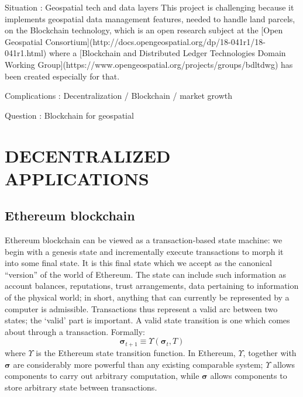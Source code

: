 \documentclass{isprs} %
\begin{document}
Situation : Geospatial tech and data layers
This project is challenging because it implements geospatial data management features, needed to handle land parcels, on the Blockchain technology, which is an open research subject at the [Open Geospatial Consortium](http://docs.opengeospatial.org/dp/18-041r1/18-041r1.html) where a [Blockchain and Distributed Ledger Technologies Domain Working Group](https://www.opengeospatial.org/projects/groups/bdltdwg) has been created especially for that.


Complications : Decentralization / Blockchain / market growth

Question : Blockchain for geospatial 


\newpage

\section{DECENTRALIZED APPLICATIONS}\label{sec:DECENTRALIZED APPLICATIONS}
 
\sloppy

\subsection{Ethereum blockchain}\label{sec:Ethereum blockchain}

Ethereum blockchain can be viewed as a transaction-based state machine: we begin with a genesis state and incrementally execute transactions to morph it into some final state. It is this final state which we accept as the canonical “version” of the world of Ethereum. The state can include such information as account balances, reputations, trust arrangements, data pertaining to information of the physical world; in short, anything that can currently be represented by a computer is admissible. Transactions thus represent a valid arc between two states; the ‘valid’ part is important. A valid state transition is one which comes about through a transaction. Formally:
\begin{equation}
\boldsymbol{\sigma}_{t+1} \equiv \Upsilon(\boldsymbol{\sigma}_{t}, T)
\end{equation}
where $\Upsilon$ is the Ethereum state transition function. In Ethereum, $\Upsilon$, together with $\boldsymbol{\sigma}$ are considerably more powerful than any existing comparable system; $\Upsilon$ allows components to carry out arbitrary computation, while $\boldsymbol{\sigma}$ allows components to store arbitrary state between transactions.
\end{document}
